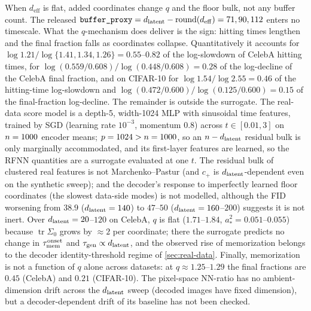 \begin{remark}\label{rem:blunt-real}
When $d_{\mathrm{eff}}$ is flat, added coordinates change $q$ and the floor bulk, not any buffer count. The released $\texttt{buffer\_proxy}=d_{\mathrm{latent}}-\mathrm{round}(d_{\mathrm{eff}})=71,90,112$ enters no timescale. What the $q$-mechanism does deliver is the sign: hitting times lengthen and the final fraction falls as coordinates collapse. Quantitatively it accounts for $\log1.21/\log\{1.41,1.34,1.26\}=0.55$--$0.82$ of the log-slowdown of CelebA hitting times, for $\log(0.559/0.608)/\log(0.448/0.608)=0.28$ of the log-decline of the CelebA final fraction, and on CIFAR-10 for $\log1.54/\log2.55=0.46$ of the hitting-time log-slowdown and $\log(0.472/0.600)/\log(0.125/0.600)=0.15$ of the final-fraction log-decline. The remainder is outside the surrogate. The real-data score model is a depth-5, width-1024 MLP with sinusoidal time features, trained by SGD (learning rate $10^{-3}$, momentum $0.8$) across $t\in[0.01,3]$ on $n=1000$ encoder means; $p=1024>n=1000$, so an $n-d_{\mathrm{latent}}$ residual bulk is only marginally accommodated, and its first-layer features are learned, so the RFNN quantities are a surrogate evaluated at one $t$. The residual bulk of clustered real features is not Marchenko--Pastur (and $c_+$ is $d_{\mathrm{latent}}$-dependent even on the synthetic sweep); and the decoder's response to imperfectly learned floor coordinates (the slowest data-side modes) is not modelled, although the FID worsening from $38.9$ ($d_{\mathrm{latent}}=140$) to $47$--$50$ ($d_{\mathrm{latent}}=160$--$200$) suggests it is not inert. Over $d_{\mathrm{latent}}=20$--$120$ on CelebA, $q$ is flat ($1.71$--$1.84$, $a_\ast^2=0.051$--$0.055$) because $\operatorname{tr}\Sigma_0$ grows by $\approx2$ per coordinate; there the surrogate predicts no change in $\tau_{\mathrm{mem}}^{\mathrm{onset}}$ and $\tau_{\mathrm{gen}}\propto d_{\mathrm{latent}}$, and the observed rise of memorization belongs to the decoder identity-threshold regime of \cref{sec:real-data}. Finally, memorization is not a function of $q$ alone across datasets: at $q\approx1.25$--$1.29$ the final fractions are $0.45$ (CelebA) and $0.21$ (CIFAR-10). The pixel-space NN-ratio has no ambient-dimension drift across the $d_{\mathrm{latent}}$ sweep (decoded images have fixed dimension), but a decoder-dependent drift of its baseline has not been checked.
\end{remark}

